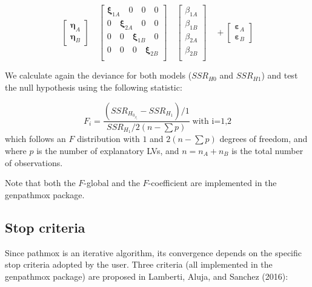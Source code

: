 \[\label{al2}
\left[\begin{array}{l}
\boldsymbol{\eta}_A \\
\boldsymbol{\eta}_B 
\end{array}\right] \quad
\left[\begin{array}{ccc}
\boldsymbol{\xi}_{1A}\quad 0 \quad0 \quad0\\
0 \quad\boldsymbol{\xi}_{2A}\quad0 \quad0\\
0 \quad0 \quad\boldsymbol{\xi}_{1B} \quad0\\
0 \quad0 \quad0 \quad \boldsymbol{\xi}_{2B}\\
\end{array}\right] \quad
\left[\begin{array}{l}
\beta_{1A} \\
\beta_{1B} \\
\beta_{2A} \\
\beta_{2B} \\
\end{array}\right]  \quad +
\left[\begin{array}{l}
\boldsymbol{\varepsilon}_A \\
\boldsymbol{\varepsilon}_B 
\end{array}\right]\]

We calculate again the deviance for both models (\(SSR_{H0}\) and
\(SSR_{H1}\)) and test the null hypothesis using the following statistic:

\[\label{F_coefl}
F_i  = \frac{\left(SSR_{H_{0_{\beta_i}}}-SSR_{H_1}\right) \Bigg/1}{SSR_{H_1}\Bigg/2\left(n-\sum p\right)}  \; \text{with i=1,2}\]
which follows an \(F\) distribution with \(1\) and
\(2\left(n - \sum p\right)\) degrees of freedom, and where \(p\) is the
number of explanatory LVs, and \(n = n_A + n_B\) is the total number of
observations.

Note that both the \(F\)-global and the \(F\)-coefficient are implemented in
the genpathmox package.

\hypertarget{stop-criteria}{%
\subsection{Stop criteria}\label{stop-criteria}}

Since pathmox is an iterative algorithm, its convergence depends on the
specific stop criteria adopted by the user. Three criteria (all
implemented in the genpathmox package) are proposed in Lamberti, Aluja, and Sanchez (2016):

